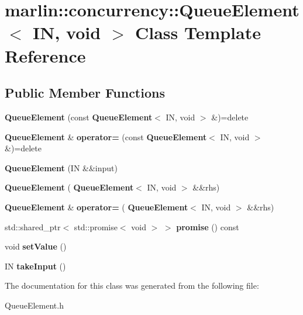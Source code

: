 \section{marlin\+:\+:concurrency\+:\+:Queue\+Element$<$ IN, void $>$ Class Template Reference}
\label{classmarlin_1_1concurrency_1_1QueueElement_3_01IN_00_01void_01_4}
\subsection*{Public Member Functions}
\begin{DoxyCompactItemize}
\item 
\mbox{\label{classmarlin_1_1concurrency_1_1QueueElement_3_01IN_00_01void_01_4_a08306fa5693a03daa8e4c938b549a2ba}} 
{\bfseries Queue\+Element} (const \textbf{ Queue\+Element}$<$ IN, void $>$ \&)=delete
\item 
\mbox{\label{classmarlin_1_1concurrency_1_1QueueElement_3_01IN_00_01void_01_4_ab0843a8fba82c927967594161c29fa53}} 
\textbf{ Queue\+Element} \& {\bfseries operator=} (const \textbf{ Queue\+Element}$<$ IN, void $>$ \&)=delete
\item 
\mbox{\label{classmarlin_1_1concurrency_1_1QueueElement_3_01IN_00_01void_01_4_ad62984e1aecd6f588d711215664820be}} 
{\bfseries Queue\+Element} (IN \&\&input)
\item 
\mbox{\label{classmarlin_1_1concurrency_1_1QueueElement_3_01IN_00_01void_01_4_a61456d2ff3b330edfd54fbe08f6cd281}} 
{\bfseries Queue\+Element} (\textbf{ Queue\+Element}$<$ IN, void $>$ \&\&rhs)
\item 
\mbox{\label{classmarlin_1_1concurrency_1_1QueueElement_3_01IN_00_01void_01_4_adacf41504baeedcf8874703ee2e89f96}} 
\textbf{ Queue\+Element} \& {\bfseries operator=} (\textbf{ Queue\+Element}$<$ IN, void $>$ \&\&rhs)
\item 
\mbox{\label{classmarlin_1_1concurrency_1_1QueueElement_3_01IN_00_01void_01_4_a88c480ef48ce66a2acf186fd379993cf}} 
std\+::shared\+\_\+ptr$<$ std\+::promise$<$ void $>$ $>$ {\bfseries promise} () const
\item 
\mbox{\label{classmarlin_1_1concurrency_1_1QueueElement_3_01IN_00_01void_01_4_a9d3f230b22cee255053094125c3baaa3}} 
void {\bfseries set\+Value} ()
\item 
\mbox{\label{classmarlin_1_1concurrency_1_1QueueElement_3_01IN_00_01void_01_4_a7e2a3ada89d3819c75271fa62778491d}} 
IN {\bfseries take\+Input} ()
\end{DoxyCompactItemize}


The documentation for this class was generated from the following file\+:\begin{DoxyCompactItemize}
\item 
Queue\+Element.\+h\end{DoxyCompactItemize}

